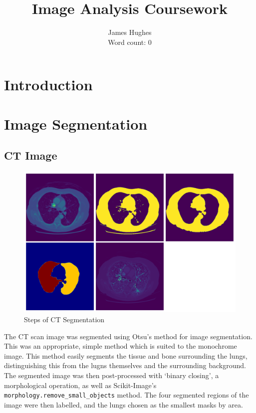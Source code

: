 \documentclass[12pt]{article}
\title{Image Analysis Coursework}
\author{James Hughes\\ Word count: 0}
\begin{document}
\maketitle

\newpage

\tableofcontents

\newpage

\section{Introduction}

\section{Image Segmentation}



\subsection{CT Image}

\begin{figure}[hp]
    \includegraphics[scale=0.35]{figures/ct_segmentation.png}
    \caption{Steps of CT Segmentation}
    \label{fig:ct}
\end{figure}

The CT scan image was segmented using Otsu's method for image segmentation.
This was an appropriate, simple method which is suited to the monochrome image.
This method easily segments the tissue and bone surrounding the lungs,
distinguishing this from the lugns themselves and the surrounding background.
The segmented image was then post-processed with `binary closing', a morphological operation,
as well as Scikit-Image's \texttt{morphology.remove\_small\_objects} method.
The four segmented regions of the image were then labelled, and the lungs chosen as the smallest masks by area.
\end{document}
